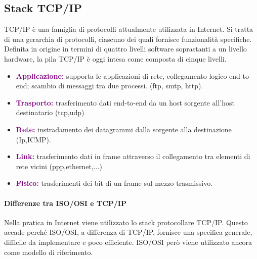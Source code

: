 \subsection{Stack TCP/IP}
TCP/IP è una famiglia di protocolli attualmente utilizzata in Internet. Si tratta di una gerarchia di protocolli, ciascuno dei quali fornisce funzionalità specifiche.
\newline Definita in origine in termini di quattro livelli software soprastanti a un livello hardware, la pila TCP/IP è oggi intesa come composta di cinque livelli.
\begin{itemize}
    \item \textbf{\textcolor{purple}{Applicazione:}} supporta le applicazioni di rete, collegamento logico end-to-end; scambio di messaggi tra due processi. (ftp, smtp, http).
    \item \textbf{\textcolor{purple}{Trasporto:}} trasferimento dati end-to-end da un host sorgente all’host destinatario (tcp,udp)
    \item \textbf{\textcolor{purple}{Rete:}} instradamento dei datagrammi dalla sorgente alla destinazione (Ip,ICMP).
    \item \textbf{\textcolor{purple}{Link:}} trasferimento dati in frame attraverso il collegamento tra elementi di rete vicini (ppp,ethernet,...)
    \item \textbf{\textcolor{purple}{Fisico:}} trasferimenti dei bit di un frame sul mezzo trasmissivo.
\end{itemize}

\paragraph{Differenze tra ISO/OSI e TCP/IP} Nella pratica in Internet viene utilizzato lo stack protocollare TCP/IP. Questo accade perché ISO/OSI, a differenza di TCP/IP, fornisce una specifica generale, difficile da implementare e poco efficiente. ISO/OSI però viene utilizzato ancora come modello di riferimento.